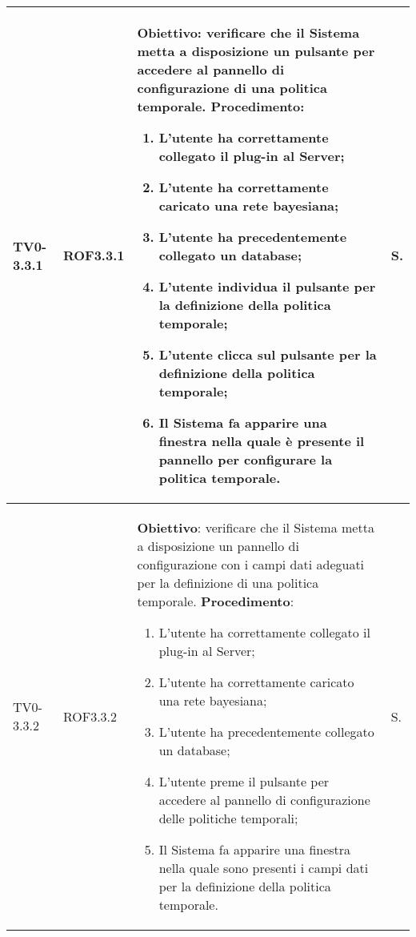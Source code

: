 \begin{longtable}{|C{.15\textwidth}|C{.13\textwidth}|m{.65\textwidth}|C{.08\textwidth}|}
TV0-3.3.1 & ROF3.3.1 &
	\textbf{Obiettivo}: verificare che il Sistema metta a disposizione un pulsante per accedere al pannello di configurazione di una politica temporale. \newline
	\textbf{Procedimento}:
	\begin{enumerate}
		\item L'utente ha correttamente collegato il plug-in al Server;
		\item L'utente ha correttamente caricato una rete bayesiana;
		\item L'utente ha precedentemente collegato un database;
		\item L'utente individua il pulsante per la definizione della politica temporale;
		\item L'utente clicca sul pulsante per la definizione della politica temporale;
		\item Il Sistema fa apparire una finestra nella quale è presente il pannello per configurare la politica temporale.
	\end{enumerate}
	& S. \\
\hline

TV0-3.3.2 & ROF3.3.2 &
	\textbf{Obiettivo}: verificare che il Sistema metta a disposizione un pannello di configurazione con i campi dati adeguati per la definizione di una politica temporale. \newline
	\textbf{Procedimento}:
	\begin{enumerate}
		\item L'utente ha correttamente collegato il plug-in al Server;
		\item L'utente ha correttamente caricato una rete bayesiana;
		\item L'utente ha precedentemente collegato un database;
		\item L'utente preme il pulsante per accedere al pannello di configurazione delle politiche temporali;
		\item Il Sistema fa apparire una finestra nella quale sono presenti i campi dati per la definizione della politica temporale.
	\end{enumerate}
	& S. \\
\hline


\end{longtable}
